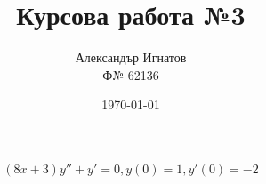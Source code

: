 \documentclass{article}
\title{Курсова работа №3}
\author{Александър Игнатов \\ Ф№ 62136 }
\date{\today}
\begin{document}
\maketitle

\[
    (8x+3)y'' + y' = 0, y(0) = 1, y'(0) = -2
\]
\end{document}
